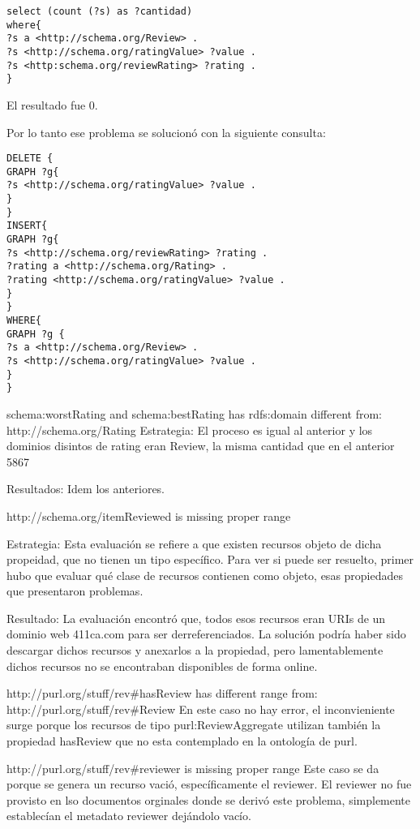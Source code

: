 \begin{lstlisting}[frame=single]  
select (count (?s) as ?cantidad) 
where{
?s a <http://schema.org/Review> . 
?s <http://schema.org/ratingValue> ?value . 
?s <http:schema.org/reviewRating> ?rating . 
}
\end{lstlisting}

El resultado fue 0.

Por lo tanto ese problema se solucionó con la siguiente consulta:

\begin{lstlisting}[frame=single]  
DELETE { 
GRAPH ?g{ 
?s <http://schema.org/ratingValue> ?value . 
} 
} 
INSERT{ 
GRAPH ?g{ 
?s <http://schema.org/reviewRating> ?rating . 
?rating a <http://schema.org/Rating> . 
?rating <http://schema.org/ratingValue> ?value . 
}
}
WHERE{
GRAPH ?g {
?s a <http://schema.org/Review> .
?s <http://schema.org/ratingValue> ?value .
}
}
\end{lstlisting}

schema:worstRating and schema:bestRating has rdfs:domain different from: http://schema.org/Rating
Estrategia:
El proceso es igual al anterior y los dominios disintos de rating eran Review, la misma cantidad que en el anterior 5867

Resultados: 
Idem los anteriores.

http://schema.org/itemReviewed is missing proper range

Estrategia:
Esta evaluación se refiere a que existen recursos objeto de dicha propeidad, que no tienen un tipo específico. Para ver si 
puede ser resuelto, primer hubo que evaluar qué clase de recursos contienen como objeto, esas propiedades que presentaron problemas.

Resultado:
La evaluación encontró que, todos esos recursos eran URIs de un dominio web 411ca.com para ser derreferenciados. La solución podría haber sido 
descargar dichos recursos y anexarlos a la propiedad, pero lamentablemente dichos recursos no se encontraban disponibles de forma online.

http://purl.org/stuff/rev\#hasReview has different range from: http://purl.org/stuff/rev\#Review 
En este caso no hay error, el inconvieniente surge porque los recursos de tipo purl:ReviewAggregate utilizan también la propiedad hasReview
que no esta contemplado en la ontología de purl.

http://purl.org/stuff/rev\#reviewer is missing proper range
Este caso se da porque se genera un recurso vació, específicamente el reviewer. El reviewer no fue provisto en lso documentos orginales donde 
se derivó este problema, simplemente establecían el metadato reviewer dejándolo vacío.


